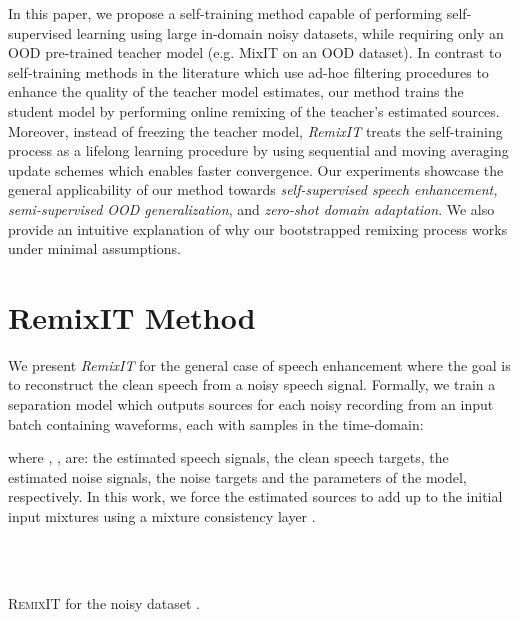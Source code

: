 \documentclass{article}
\begin{document}
In this paper, we propose a self-training method capable of performing self-supervised learning using large in-domain noisy datasets, while requiring only an OOD pre-trained teacher model (e.g. MixIT on an OOD dataset). In contrast to self-training methods in the literature which use ad-hoc filtering procedures to enhance the quality of the teacher model estimates, our method trains the student model by performing online remixing of the teacher's estimated sources. Moreover, instead of freezing the teacher model, \textit{RemixIT} treats the self-training process as a lifelong learning procedure by using sequential and moving averaging update schemes which enables faster convergence. Our experiments showcase the general applicability of our method towards \emph{self-supervised speech enhancement, semi-supervised OOD generalization}, and \emph{zero-shot domain adaptation}. We also provide an intuitive explanation of why our bootstrapped remixing process works under minimal assumptions.

\section{RemixIT Method}
\label{sec:remix_method}
We present \textit{RemixIT} for the general case of speech enhancement where the goal is to reconstruct the clean speech from a noisy speech signal. Formally, we train a separation model  which outputs  sources for each noisy recording from an input batch  containing  waveforms, each with  samples in the time-domain:

where , ,  are: the estimated speech signals, the clean speech targets, the estimated noise signals, the noise targets and the parameters of the model, respectively. In this work, we force the estimated sources  to add up to the initial input mixtures  using a mixture consistency layer \cite{wisdom2019differentiableMixtureConsistency}.

\begin{algorithm}[t!]
\SetAlgoLined
     \\
     \\
 \caption{\textsc{RemixIT} for the noisy dataset .}
 \label{alg:remixit}
\end{algorithm}
 
\end{document}
